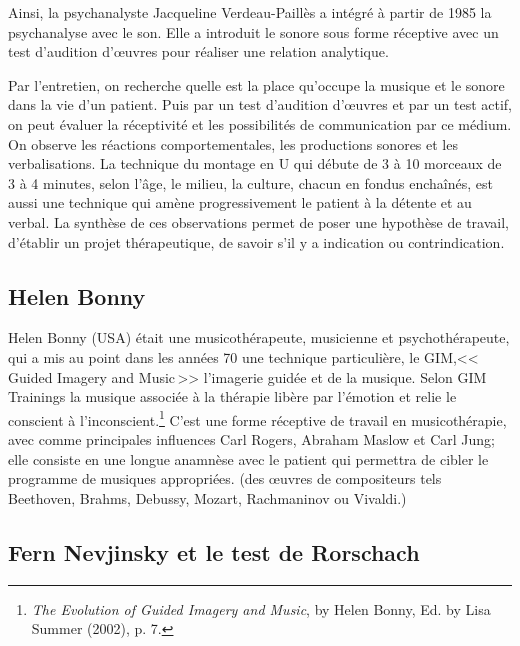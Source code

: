  Ainsi, la psychanalyste Jacqueline Verdeau-Paillès a 
intégré à partir de 1985 la psychanalyse avec le son. Elle a  introduit
 le sonore 
sous forme réceptive avec un test d'audition d'\oe uvres pour réaliser
une relation analytique\autocite{verdeau-pailles:bilan}.

Par l'entretien, on recherche quelle est la place qu'occupe la
musique et le sonore dans la vie d'un patient. Puis par un test
d'audition d'\oe uvres et par un test actif, on peut évaluer la
réceptivité et les possibilités de communication par ce médium. On
observe les réactions comportementales, les productions sonores et les
verbalisations. La technique du montage en U qui débute de 3 à 10
morceaux de 3 à 4 minutes, selon l'âge, le milieu, la culture, chacun
en fondus enchaînés, est aussi une technique qui amène progressivement le patient à la détente
et au verbal.
La synthèse de ces observations permet de poser une hypothèse de
travail, d'établir un projet thérapeutique, de savoir s'il y a
indication ou contrindication.





\subsection{Helen Bonny} 


Helen Bonny (USA) était une musicothérapeute,
musicienne et psychothérapeute, qui a mis au point dans les années 70
une technique particulière, le GIM,<<\,Guided Imagery and Music\,>>
l'imagerie guidée et de la musique. Selon GIM
Trainings\autocite{gim_site} la
musique associée à la thérapie libère par l'émotion et relie le
conscient à l'inconscient.\footnote{\textsl{The Evolution of Guided Imagery and Music}, 
	by Helen Bonny, Ed. by Lisa Summer (2002), p. 7.}
 C'est une forme réceptive de travail
en musicothérapie, avec comme principales influences Carl Rogers, Abraham Maslow et Carl Jung; 
elle  consiste en une longue anamnèse avec le
patient qui permettra de cibler le programme de musiques appropriées. 
(des \oe uvres de compositeurs tels Beethoven, Brahms, Debussy,
Mozart, Rachmaninov ou Vivaldi.)






 \subsection{Fern Nevjinsky et le test de Rorschach}
 
